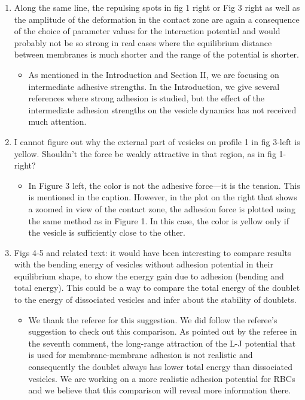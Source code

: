 \documentclass[11pt]{article}
\newcommand{\comment}[1]{{\color{blue} #1}}
\begin{document}
\begin{enumerate}
\item\comment{Along the same line, the repulsing spots in fig 1 right or Fig 3
right as well as the amplitude of the deformation in the contact zone
are again a consequence of the choice of parameter values for the
interaction potential and would probably not be so strong in real
cases where the equilibrium distance between membranes is much shorter
and the range of the potential is shorter.}
\begin{itemize}
  \item As mentioned in the Introduction and Section II, we are focusing
    on intermediate adhesive strengths.  In the Introduction, we give
    several references where strong adhesion is studied, but the effect
    of the intermediate adhesion strengths on the vesicle dynamics has
    not received much attention.
\end{itemize}

\item\comment{I cannot figure out why the external part of vesicles on profile 1
in fig 3-left is yellow. Shouldn't the force be weakly attractive in
that region, as in fig 1-right?}
\begin{itemize}
  \item In Figure 3 left, the color is not the adhesive force---it is the
    tension.  This is mentioned in the caption.  However, in the plot on
    the right that shows a zoomed in view of the contact zone, the
    adhesion force is plotted using the same method as in Figure 1.  In
    this case, the color is yellow only if the vesicle is sufficiently
    close to the other.
\end{itemize}

\item\comment{Figs 4-5 and related text: it would have been interesting to
compare results with the bending energy of vesicles without adhesion
potential in their equilibrium shape, to show the energy gain due to
adhesion (bending and total energy). This could be a way to compare
the total energy of the doublet to the energy of dissociated vesicles
and infer about the stability of doublets.}
\begin{itemize}
  \item We thank the referee for this suggestion. We did follow the referee's suggestion to check out this comparison. As pointed out by the referee in the seventh comment,
  the long-range attraction of the L-J potential that is used for membrane-membrane adhesion is not realistic and consequently the doublet always has lower total energy than
  dissociated vesicles. We are working on a more realistic adhesion potential for RBCs and we believe that this comparison will reveal more information there.
\end{itemize}


\end{enumerate}
\end{document}
